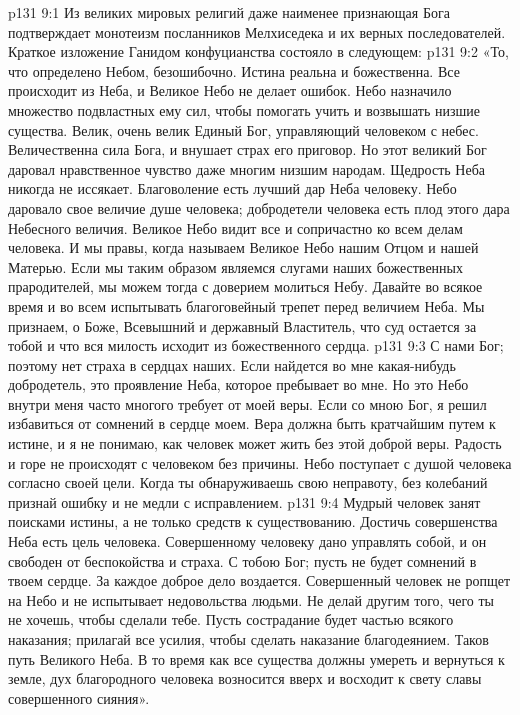 \vs p131 9:1 Из великих мировых религий даже наименее признающая Бога подтверждает монотеизм посланников Мелхиседека и их верных последователей. Краткое изложение Ганидом конфуцианства состояло в следующем:
\vs p131 9:2 \pc «То, что определено Небом, безошибочно. Истина реальна и божественна. Все происходит из Неба, и Великое Небо не делает ошибок. Небо назначило множество подвластных ему сил, чтобы помогать учить и возвышать низшие существа. Велик, очень велик Единый Бог, управляющий человеком с небес. Величественна сила Бога, и внушает страх его приговор. Но этот великий Бог даровал нравственное чувство даже многим низшим народам. Щедрость Неба никогда не иссякает. Благоволение есть лучший дар Неба человеку. Небо даровало свое величие душе человека; добродетели человека есть плод этого дара Небесного величия. Великое Небо видит все и сопричастно ко всем делам человека. И мы правы, когда называем Великое Небо нашим Отцом и нашей Матерью. Если мы таким образом являемся слугами наших божественных прародителей, мы можем тогда с доверием молиться Небу. Давайте во всякое время и во всем испытывать благоговейный трепет перед величием Неба. Мы признаем, о Боже, Всевышний и державный Властитель, что суд остается за тобой и что вся милость исходит из божественного сердца.
\vs p131 9:3 С нами Бог; поэтому нет страха в сердцах наших. Если найдется во мне какая\hyp{}нибудь добродетель, это проявление Неба, которое пребывает во мне. Но это Небо внутри меня часто многого требует от моей веры. Если со мною Бог, я решил избавиться от сомнений в сердце моем. Вера должна быть кратчайшим путем к истине, и я не понимаю, как человек может жить без этой доброй веры. Радость и горе не происходят с человеком без причины. Небо поступает с душой человека согласно своей цели. Когда ты обнаруживаешь свою неправоту, без колебаний признай ошибку и не медли с исправлением.
\vs p131 9:4 Мудрый человек занят поисками истины, а не только средств к существованию. Достичь совершенства Неба есть цель человека. Совершенному человеку дано управлять собой, и он свободен от беспокойства и страха. С тобою Бог; пусть не будет сомнений в твоем сердце. За каждое доброе дело воздается. Совершенный человек не ропщет на Небо и не испытывает недовольства людьми. Не делай другим того, чего ты не хочешь, чтобы сделали тебе. Пусть сострадание будет частью всякого наказания; прилагай все усилия, чтобы сделать наказание благодеянием. Таков путь Великого Неба. В то время как все существа должны умереть и вернуться к земле, дух благородного человека возносится вверх и восходит к свету славы совершенного сияния».
